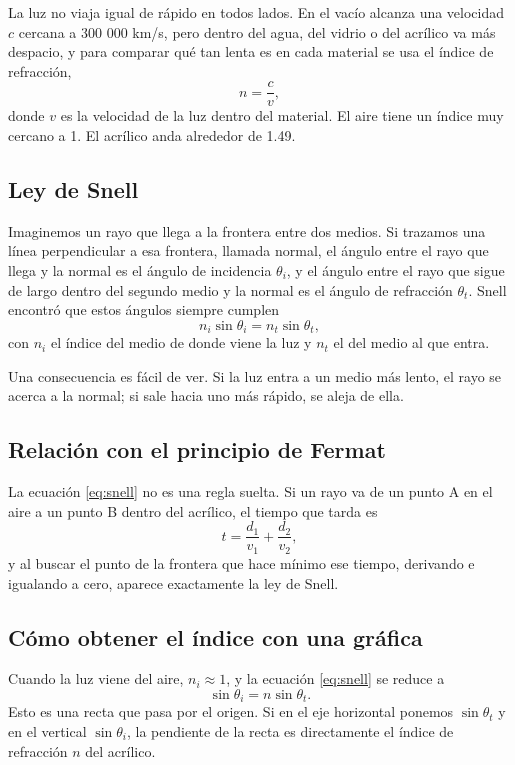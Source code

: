 La luz no viaja igual de rápido en todos lados. En el vacío alcanza una velocidad $c$ cercana a 300 000 km/s, pero dentro del agua, del vidrio o del acrílico va más despacio, y para comparar qué tan lenta es en cada material se usa el índice de refracción,
\begin{equation}
n = \frac{c}{v},
\label{eq:indice}
\end{equation}
donde $v$ es la velocidad de la luz dentro del material. El aire tiene un índice muy cercano a 1. El acrílico anda alrededor de 1.49.

\subsection{Ley de Snell}
Imaginemos un rayo que llega a la frontera entre dos medios. Si trazamos una línea perpendicular a esa frontera, llamada normal, el ángulo entre el rayo que llega y la normal es el ángulo de incidencia $\theta_i$, y el ángulo entre el rayo que sigue de largo dentro del segundo medio y la normal es el ángulo de refracción $\theta_t$. Snell encontró que estos ángulos siempre cumplen
\begin{equation}
n_i \sin\theta_i = n_t \sin\theta_t ,
\label{eq:snell}
\end{equation}
con $n_i$ el índice del medio de donde viene la luz y $n_t$ el del medio al que entra.

Una consecuencia es fácil de ver. Si la luz entra a un medio más lento, el rayo se acerca a la normal; si sale hacia uno más rápido, se aleja de ella.

\subsection{Relación con el principio de Fermat}
La ecuación \eqref{eq:snell} no es una regla suelta. Si un rayo va de un punto A en el aire a un punto B dentro del acrílico, el tiempo que tarda es
\begin{equation}
t = \frac{d_1}{v_1} + \frac{d_2}{v_2},
\label{eq:tiempo}
\end{equation}
y al buscar el punto de la frontera que hace mínimo ese tiempo, derivando e igualando a cero, aparece exactamente la ley de Snell.

\subsection{Cómo obtener el índice con una gráfica}
Cuando la luz viene del aire, $n_i \approx 1$, y la ecuación \eqref{eq:snell} se reduce a
\begin{equation}
\sin\theta_i = n \sin\theta_t .
\label{eq:recta}
\end{equation}
Esto es una recta que pasa por el origen. Si en el eje horizontal ponemos $\sin\theta_t$ y en el vertical $\sin\theta_i$, la pendiente de la recta es directamente el índice de refracción $n$ del acrílico.

